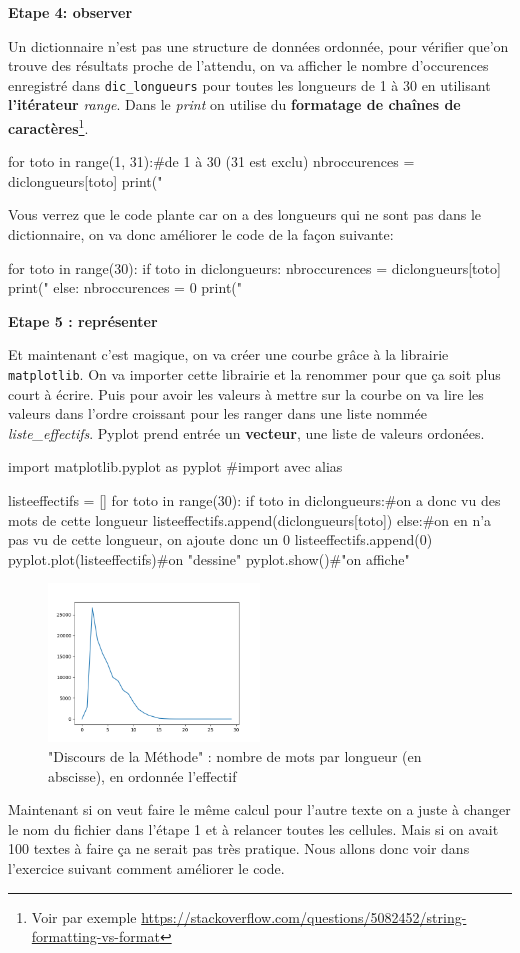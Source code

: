 \textbf{Etape 4: observer}

Un dictionnaire n'est pas une structure de données ordonnée, pour
vérifier que'on trouve des résultats proche de l'attendu, on va afficher
le nombre d'occurences enregistré dans \texttt{dic\_longueurs} pour
toutes les longueurs de 1 à 30 en utilisant \textbf{l'itérateur} \textit{range}.
Dans le \textit{print} on utilise du \textbf{formatage de chaînes
de caractères}\footnote{Voir par exemple \url{https://stackoverflow.com/questions/5082452/string-formatting-vs-format}}.

\begin{python} for toto in range(1, 31):\#de 1 à 30 (31 est exclu)
nbroccurences = diclongueurs{[}toto{]} print("%
\end{python}

Vous verrez que le code plante car on a des longueurs qui ne sont
pas dans le dictionnaire, on va donc améliorer le code de la façon
suivante:

\begin{python} for toto in range(30): if toto in diclongueurs: nbroccurences
= diclongueurs{[}toto{]} print("%
 else: nbroccurences = 0 print("%
\end{python}

\textbf{Etape 5 : représenter}

Et maintenant c'est magique, on va créer une courbe grâce à la librairie
\texttt{matplotlib}. On va importer cette librairie et la renommer
pour que ça soit plus court à écrire. Puis pour avoir les valeurs
à mettre sur la courbe on va lire les valeurs dans l'ordre croissant
pour les ranger dans une liste nommée \textit{liste\_effectifs}. Pyplot
prend entrée un \textbf{vecteur}, une liste de valeurs ordonées.

\begin{python} import matplotlib.pyplot as pyplot \#import avec alias

listeeffectifs = {[}{]} for toto in range(30): if toto in diclongueurs:\#on
a donc vu des mots de cette longueur listeeffectifs.append(diclongueurs{[}toto{]})
else:\#on en n'a pas vu de cette longueur, on ajoute donc un 0 listeeffectifs.append(0)
pyplot.plot(listeeffectifs)\#on "dessine" pyplot.show()\#"on affiche"

\end{python}

\begin{figure}
\centering{}
\includegraphics[width=0.5\textwidth]{../images/TD1_effectifs1.png}
\caption{"Discours de la Méthode" : nombre de mots par longueur (en abscisse),
en ordonnée l'effectif}
\end{figure}

Maintenant si on veut faire le même calcul pour l'autre texte on a
juste à changer le nom du fichier dans l'étape 1 et à relancer toutes
les cellules. Mais si on avait 100 textes à faire ça ne serait pas
très pratique. Nous allons donc voir dans l'exercice suivant comment
améliorer le code.
